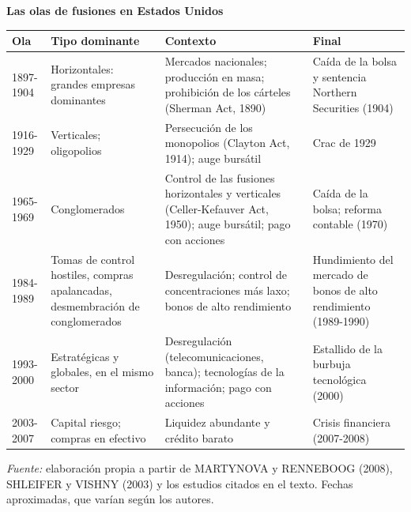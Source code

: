 \documentclass[10pt,a4paper]{article}
\begin{document}
\begin{center}\begin{minipage}{\linewidth}\centering
{\small\textbf{Las olas de fusiones en Estados Unidos}}\par\vspace{0.3em}
\footnotesize
\begin{tabular}{p{1.5cm} p{3.3cm} p{5.2cm} p{4.1cm}}
\hline
\raggedright\textbf{Ola} & \raggedright\textbf{Tipo dominante} & \raggedright\textbf{Contexto} & \raggedright\textbf{Final}\tabularnewline
\hline
\raggedright 1897-1904 & \raggedright Horizontales: grandes empresas dominantes & \raggedright Mercados nacionales; producción en masa; prohibición de los cárteles (Sherman Act, 1890) & \raggedright Caída de la bolsa y sentencia Northern Securities (1904)\tabularnewline
\raggedright 1916-1929 & \raggedright Verticales; oligopolios & \raggedright Persecución de los monopolios (Clayton Act, 1914); auge bursátil & \raggedright Crac de 1929\tabularnewline
\raggedright 1965-1969 & \raggedright Conglomerados & \raggedright Control de las fusiones horizontales y verticales (Celler-Kefauver Act, 1950); auge bursátil; pago con acciones & \raggedright Caída de la bolsa; reforma contable (1970)\tabularnewline
\raggedright 1984-1989 & \raggedright Tomas de control hostiles, compras apalancadas, desmembración de conglomerados & \raggedright Desregulación; control de concentraciones más laxo; bonos de alto rendimiento & \raggedright Hundimiento del mercado de bonos de alto rendimiento (1989-1990)\tabularnewline
\raggedright 1993-2000 & \raggedright Estratégicas y globales, en el mismo sector & \raggedright Desregulación (telecomunicaciones, banca); tecnologías de la información; pago con acciones & \raggedright Estallido de la burbuja tecnológica (2000)\tabularnewline
\raggedright 2003-2007 & \raggedright Capital riesgo; compras en efectivo & \raggedright Liquidez abundante y crédito barato & \raggedright Crisis financiera (2007-2008)\tabularnewline
\hline
\end{tabular}\par\vspace{0.3em}
{\small\textit{Fuente: }elaboración propia a partir de MARTYNOVA y RENNEBOOG (2008), SHLEIFER y VISHNY (2003) y los estudios citados en el texto. Fechas aproximadas, que varían según los autores.}
\end{minipage}\end{center}
\end{document}
